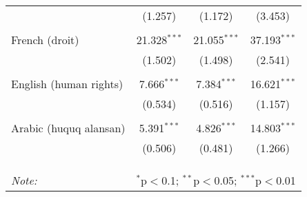 \begin{table}[!htbp]
\begin{tabular}{@{\extracolsep{5pt}}lccc}
  & (1.257) & (1.172) & (3.453) \\ 
  & & & \\ 
 French (droit) & 21.328$^{***}$ & 21.055$^{***}$ & 37.193$^{***}$ \\ 
  & (1.502) & (1.498) & (2.541) \\ 
  & & & \\ 
 English (human rights) & 7.666$^{***}$ & 7.384$^{***}$ & 16.621$^{***}$ \\ 
  & (0.534) & (0.516) & (1.157) \\ 
  & & & \\ 
 Arabic (huquq alansan) & 5.391$^{***}$ & 4.826$^{***}$ & 14.803$^{***}$ \\ 
  & (0.506) & (0.481) & (1.266) \\ 
  & & & \\ 
\hline \\[-1.8ex] 
\hline 
\hline \\[-1.8ex] 
\textit{Note:}  & \multicolumn{3}{r}{$^{*}$p$<$0.1; $^{**}$p$<$0.05; $^{***}$p$<$0.01} \\ 
\end{tabular} 
\end{table} 

